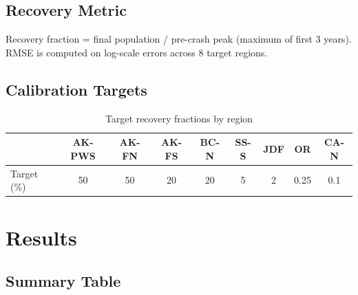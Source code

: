 \documentclass[11pt,a4paper]{article}
\begin{document}
\subsection{Recovery Metric}
Recovery fraction = final population / pre-crash peak (maximum of first 3 years). RMSE is computed on log-scale errors across 8 target regions.

\subsection{Calibration Targets}

\begin{table}[H]
\centering
\caption{Target recovery fractions by region}
\begin{tabular}{lcccccccc}
\toprule
& AK-PWS & AK-FN & AK-FS & BC-N & SS-S & JDF & OR & CA-N \\
\midrule
Target (\%) & 50 & 50 & 20 & 20 & 5 & 2 & 0.25 & 0.1 \\
\bottomrule
\end{tabular}
\end{table}


\section{Results}

\subsection{Summary Table}
\end{document}
